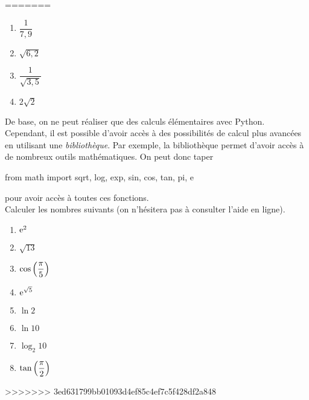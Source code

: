 =======
\begin{multicols}{2}
  \begin{enumerate}[label=\emph{\alph*)}]
    \item $\dfrac{1}{7,9}$
    \item $\sqrt{6,2}$
    \item $\dfrac{1}{\sqrt{3,5}}$
    \item $2\sqrt{2}$
  \end{enumerate}
\end{multicols}
De base, on ne peut réaliser que des calculs élémentaires avec Python. Cependant, il est possible d'avoir accès à des possibilités de calcul plus avancées en utilisant une \emph{bibliothèque}. 
Par exemple, la bibliothèque  permet d'avoir accès à de nombreux outils mathématiques. 
On peut donc taper
\begin{pyverbatim}
  from math import sqrt, log, exp, sin, cos, tan, pi, e 
\end{pyverbatim}
pour avoir accès à toutes ces fonctions. \\
Calculer les nombres suivants (on n'hésitera pas à consulter l'aide en ligne).
\begin{multicols}{2}
  \begin{enumerate}[label=\emph{\alph*)}]
    \item $\mathrm{e}^2$
    \item $\sqrt{13}$
    \item $\cos\left( \dfrac{\pi}{5}\right)$
    \item $\mathrm{e}^{\sqrt{5}}$
    \item $\ln 2$
    \item $\ln 10$
    \item $\log_{2} 10$
    \item $\tan\left( \dfrac{\pi}{2}\right)$
  \end{enumerate}
\end{multicols}
>>>>>>> 3ed631799bb01093d4ef85c4ef7c5f428df2a848
